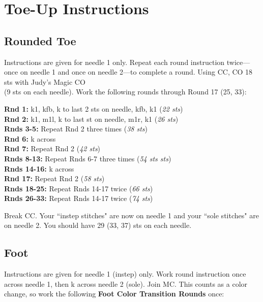 \documentclass[12pt]{article}
\newcommand{\rowDir}[1]{\textbf{#1:}} %
\newcommand{\stitchcount}[1]{(\emph{#1 sts})}
\begin{document}
\section*{Toe-Up Instructions}
\begin{multicols}{2}

\subsection*{Rounded Toe}

Instructions are given for needle 1 only. Repeat each round instruction twice---once on needle 1 and once on needle 2---to complete a round.
Using CC, CO 18 sts with Judy's Magic CO \\ (9 sts on each needle). Work the following rounds through Round 17 (25, 33):

\rowDir{Rnd 1} k1, kfb, k to last 2 sts on needle, kfb, k1 \stitchcount{22} \\
\rowDir{Rnd 2} k1, m1l, k to last st on needle, m1r, k1 \stitchcount{26} \\
\rowDir{Rnds 3-5} Repeat Rnd 2 three times \stitchcount{38} \\
\rowDir{Rnd 6} k across \\
\rowDir{Rnd 7} Repeat Rnd 2 \stitchcount{42} \\
\rowDir{Rnds 8-13} Repeat Rnds 6-7 three times \stitchcount{54 sts} \\
\rowDir{Rnds 14-16} k across \\
\rowDir{Rnd 17} Repeat Rnd 2 \stitchcount{58} \\
\rowDir{Rnds 18-25} Repeat Rnds 14-17 twice \stitchcount{66} \\
\rowDir{Rnds 26-33} Repeat Rnds 14-17 twice \stitchcount{74}

\vspace{1em}

Break CC. Your ``instep stitches" are now on needle 1 and your ``sole stitches" are on needle 2. You should have 29 (33, 37) sts on each needle.

\subsection*{Foot}

Instructions are given for needle 1 (instep) only. Work round instruction once across needle 1, then k across needle 2 (sole). Join MC. This counts as a color change, so work the following \textbf{Foot Color Transition Rounds} once:


\end{multicols}
\end{document}

